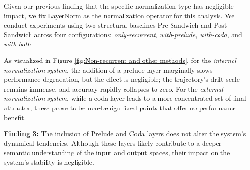 Given our previous finding that the specific normalization type has negligible impact, we fix LayerNorm as the normalization operator for this analysis. We conduct experiments using two structural baselines Pre-Sandwich and Post-Sandwich across four configurations: \textit{only-recurrent}, \textit{with-prelude}, \textit{with-coda}, and \textit{with-both}. 

As visualized in Figure \ref{fig:Non-recurrent and other methods}, for the \textit{internal normalization system}, the addition of a prelude layer marginally slows performance degradation, but the effect is negligible; the trajectory's drift scale remains immense, and accuracy rapidly collapses to zero. For the \textit{external normalization system}, while a coda layer leads to a more concentrated set of final attractor, these prove to be non-benign fixed points that offer no performance benefit.

\begin{findings}
\textbf{Finding 3:} The inclusion of Prelude and Coda layers does not alter the system's dynamical tendencies. Although these layers likely contribute to a deeper semantic understanding of the input and output spaces, their impact on the system’s stability is negligible. 
\end{findings}

\begin{table}[t]
    \centering
    \caption{Hyperparameter settings for random loop distributions. Range indicates the clipping bounds $[\text{min}, \text{max}]$.}
    \label{tab:loop_params}
\end{table}



